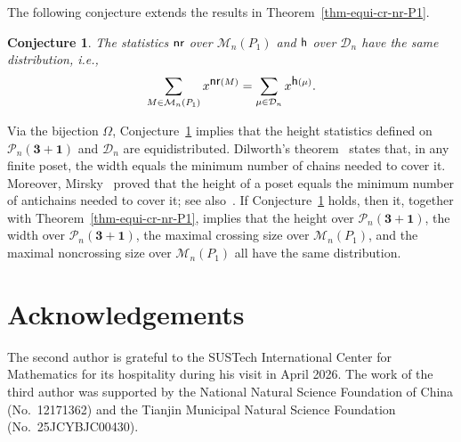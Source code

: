 \documentclass[11pt]{article}
\DeclareMathOperator{\h}{\mbox{\sf{h}}}
\DeclareMathOperator{\nr}{\mbox{\sf{nr}}}
\newtheorem{conj}[thm]{Conjecture}
\newcommand{\D}{\mathcal{D}}
\newcommand{\M}{\mathcal{M}}
\begin{document}
	The following conjecture extends the results in Theorem~\ref{thm-equi-cr-nr-P1}.
	\begin{conj}\label{conj-nr}
		The statistics $\nr$ over $\M_n(P_1)$ and  $\h$ over $\D_n$ have the same distribution, i.e.,
		\begin{align*}
			\sum_{M \in \mathcal{M}_n(P_1)} x^{\nr(M)} 
			= \sum_{\mu \in \mathcal{D}_n} x^{\h(\mu)}.
		\end{align*}
	\end{conj}
	Via the bijection $\Omega$, Conjecture~\ref{conj-nr} implies that the height statistics defined on $\mathcal{P}_n(\mathbf{3+1})$ and $\D_n$ are equidistributed.
	Dilworth's theorem~\cite{Dilworth} states that, in any finite poset, the width equals the minimum number of chains needed to cover it. Moreover, Mirsky~\cite{Mirsky} proved that the height of a poset equals the minimum number of antichains needed to cover it; see also~\cite{Greene-Kleitman}.
	If Conjecture~\ref{conj-nr} holds, then it, together with Theorem~\ref{thm-equi-cr-nr-P1}, implies that the height over $\mathcal{P}_n(\mathbf{3+1})$, the width over $\mathcal{P}_n(\mathbf{3+1})$, the maximal crossing size over $\M_n(P_1)$, and the maximal noncrossing size over $\M_n(P_1)$ all have the same distribution.
	
	\section*{Acknowledgements} 
	The second author is grateful to the SUSTech International Center for Mathematics for its hospitality during his visit in April 2026.
	The work of the third author was supported by the National Natural Science Foundation of China (No.\ 12171362) and the Tianjin Municipal Natural Science Foundation (No.\ 25JCYBJC00430).
	
\end{document}
